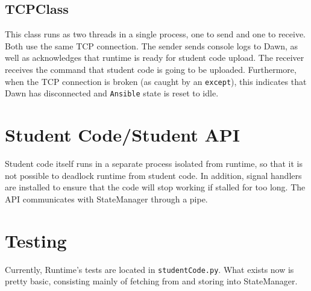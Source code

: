 \documentclass[12pt]{book}
\begin{document}
\subsection{TCPClass}\label{tcpclass}

This class runs as two threads in a single process, one to send and one
to receive. Both use the same TCP connection. The sender sends console
logs to Dawn, as well as acknowledges that runtime is ready for student
code upload. The receiver receives the command that student code is
going to be uploaded. Furthermore, when the TCP connection is broken (as
caught by an \texttt{except}), this indicates that Dawn has disconnected
and \texttt{Ansible} state is reset to idle.

\section{Student Code/Student API}
Student code itself runs in a separate process isolated from runtime, so that
it is not possible to deadlock runtime from student code. In addition,
signal handlers are installed to ensure that the code will stop
working if stalled for too long. The API communicates with StateManager
through a pipe.

\section{Testing}
Currently, Runtime's tests are located in \texttt{studentCode.py}. What
exists now is pretty basic, consisting mainly of fetching from and
storing into StateManager.
\end{document}
